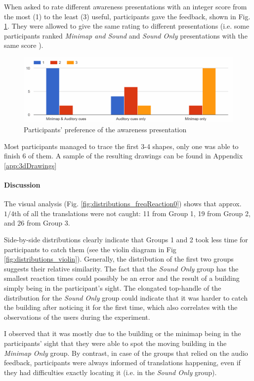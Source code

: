 When asked to rate different awareness presentations with an integer score from the most (1) to the least (3) useful, participants gave the feedback, shown in Fig. \ref{fig:finalstudyawarenesspresentationuserpreference}. They were allowed to give the same rating to different presentations (i.e. some participants ranked \textit{Minimap and Sound} and \textit{Sound Only} presentations with the same score ).

\begin{figure}
	\centering
	\includegraphics[width=0.7\linewidth]{figures/final_study_awareness_presentation_user_preference}
	\caption{Participants' preference of the awareness presentation}
	\label{fig:finalstudyawarenesspresentationuserpreference}
\end{figure}

Most participants managed to trace the first 3-4 shapes, only one was able to finish 6 of them. A sample of the resulting drawings can be found in Appendix \ref{app:3dDrawings}

\paragraph{Discussion}
The visual analysis (Fig. \ref{fig:distributions_freqReaction0}) shows that approx. $1/4$th of all the translations were not caught: 11 from Group 1, 19 from Group 2, and 26 from Group 3. %

Side-by-side distributions clearly indicate that Groups 1 and 2 took less time for participants to catch them (see the violin diagram in Fig \ref{fig:distributions_violin}). Generally, the distribution of the first two groups suggests their relative similarity. The fact that the \textit{Sound Only} group has the smallest reaction times could possibly be an error and the result of a building simply being in the participant's sight. The elongated top-handle of the distribution for the \textit{Sound Only} group could indicate that it was harder to catch the building after noticing it for the first time, which also correlates with the observations of the users during the experiment.

I observed that it was mostly due to the building or the minimap being in the participants' sight that they were able to spot the moving building in the \textit{Minimap Only} group. By contrast, in case of the groups that relied on the audio feedback, participants were always informed of translations happening, even if they had difficulties exactly locating it (i.e. in the \textit{Sound Only} group).

